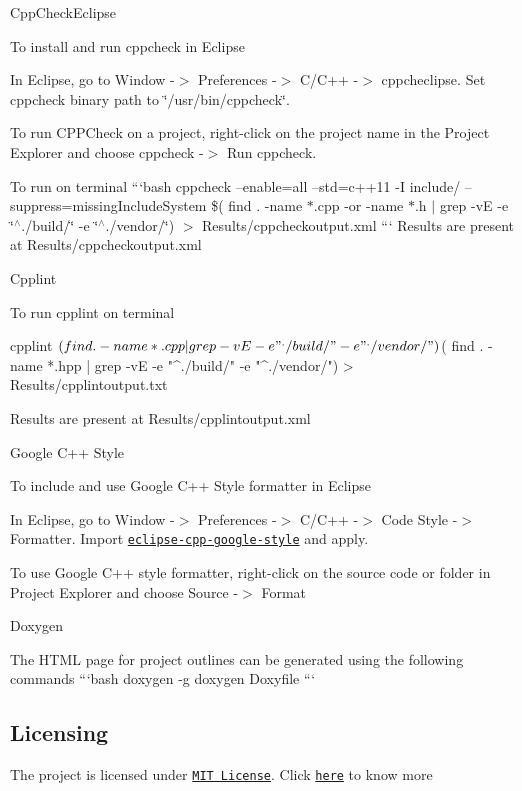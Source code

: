 \begin{DoxyItemize}
\item Cpp\+Check\+Eclipse

To install and run cppcheck in Eclipse
\begin{DoxyEnumerate}
\item In Eclipse, go to Window -\/$>$ Preferences -\/$>$ C/\+C++ -\/$>$ cppcheclipse. Set cppcheck binary path to \char`\"{}/usr/bin/cppcheck\char`\"{}.
\item To run C\+P\+P\+Check on a project, right-\/click on the project name in the Project Explorer and choose cppcheck -\/$>$ Run cppcheck.
\item To run on terminal ```bash cppcheck --enable=all --std=c++11 -\/I include/ --suppress=missing\+Include\+System \$( find . -\/name $\ast$.cpp -\/or -\/name $\ast$.h $\vert$ grep -\/vE -\/e \char`\"{}$^\wedge$./build/\char`\"{} -\/e \char`\"{}$^\wedge$./vendor/\char`\"{}) $>$ Results/cppcheckoutput.\+xml ``` Results are present at Results/cppcheckoutput.\+xml
\end{DoxyEnumerate}
\item Cpplint
\begin{DoxyEnumerate}
\item To run cpplint on terminal 
\begin{DoxyCode}
cpplint $( find . -name *.cpp | grep -vE -e "^./build/" -e "^./vendor/") $( find . -name *.hpp | grep -vE
       -e "^./build/" -e "^./vendor/") >                    Results/cpplintoutput.txt
\end{DoxyCode}
 Results are present at Results/cpplintoutput.\+xml
\end{DoxyEnumerate}
\item Google C++ Style

To include and use Google C++ Style formatter in Eclipse
\begin{DoxyEnumerate}
\item In Eclipse, go to Window -\/$>$ Preferences -\/$>$ C/\+C++ -\/$>$ Code Style -\/$>$ Formatter. Import \href{https://raw.githubusercontent.com/google/styleguide/gh-pages/eclipse-cpp-google-style.xml}{\tt eclipse-\/cpp-\/google-\/style} and apply.
\item To use Google C++ style formatter, right-\/click on the source code or folder in Project Explorer and choose Source -\/$>$ Format
\end{DoxyEnumerate}
\item Doxygen

The H\+T\+ML page for project outlines can be generated using the following commands ```bash doxygen -\/g doxygen Doxyfile ```
\end{DoxyItemize}

\subsection*{Licensing}

The project is licensed under \href{https://opensource.org/licenses/MIT}{\tt M\+IT License}. Click \href{https://github.com/kavyadevd/beginner_tutorials/blob/main/LICENSE}{\tt here} to know more 